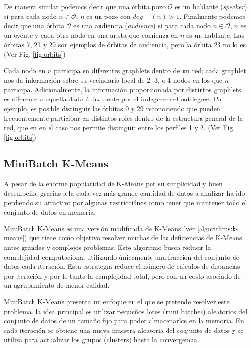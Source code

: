 De manera similar podemos decir que una órbita pozo $\mathcal{O}$ es un hablante (\emph{speaker}) si para cada nodo  $n\in\mathcal{O}$, $n$ es un pozo con $deg-(n)>1$. Finalmente podemos decir que una órbita $\mathcal{O}$ es una audiencia (\emph{audience}) si para cada nodo $n\in\mathcal{O}$, $n$ es un oyente y cada otro nodo en una arista que comienza en $n$ es un hablante. Las órbitas 7, 21 y 29 son ejemplos de órbitas de audiencia, pero la órbita 23 no lo es. (Ver Fig. \ref{fig:orbits})

Cada nodo en $n$ participa en diferentes graphlets dentro de un red; cada graphlet nos da información sobre su vecindario local de 2, 3, o 4 nodos en los que $n$ participa. Adicionalmente, la información proporcionada por distintos graphlets es diferente a aquella dada únicamente por el indegree o el outdegree. Por ejemplo, es posible distinguir las órbitas 0 y 29 reconociendo que pueden frecuentemente participar en distintos roles dentro de la estructura general de la red, que en en el caso nos permite distinguir entre los perfiles 1 y 2. (Ver Fig. \ref{fig:orbits})

\subsection{MiniBatch K-Means}

A pesar de la enorme popularidad de K-Means por su simplicidad y buen desempeño, gracias a la cada vez más grande cantidad de datos a analizar ha ido perdiendo su atractivo por algunas restricciónes como tener que mantener todo el conjunto de datos en memoria. 

MiniBatch K-Means \cite{sculley_web-scale_2010} es una versión modificada de K-Means (ver \ref{algorithms:k-means}) que tiene como objetivo resolver muchas de las deficiencias de K-Means antes grandes y complejos problemas. Este algoritmo busca reducir la complejidad computacional utilizando únicamente una fracción del conjunto de datos cada iteración. Esta estrategia reduce el número de cálculos de distancias por iteración y por lo tanto la complejidad total, pero con un costo asociado de un agrupamiento de menor calidad. \cite{bejar_k-means_nodate}

MiniBatch K-Means presenta un enfoque en el que se pretende resolver este problema, la idea principal es utilizar pequeños lotes (mini batches) aleatorios del conjunto de datos de un tamaño fijo para poder almacenarlos en la memoria. En cada iteración se obtiene una nueva muestra aleatoria del conjunto de datos y se utiliza para actualizar los grupos (clusters) hasta la convergencia. 

